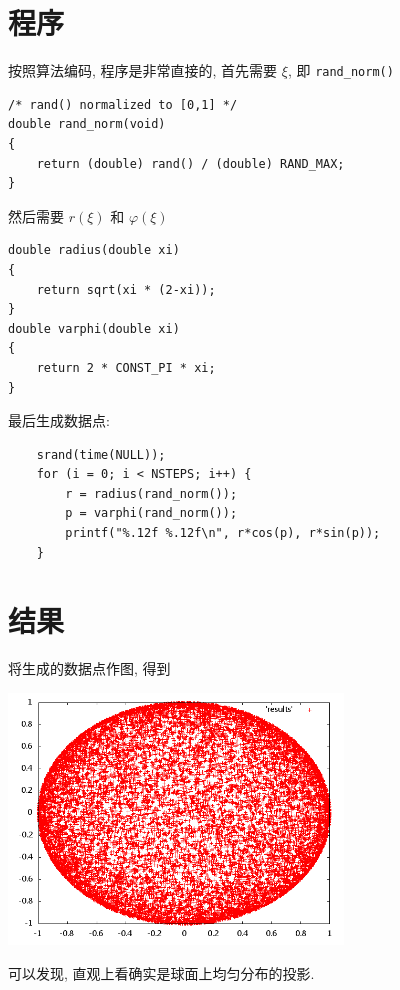 \documentclass{ctexart}
\begin{document}
\section{程序}
按照算法编码, 程序是非常直接的, 首先需要 $\xi$, 即 \verb|rand_norm()|
\begin{verbatim}
/* rand() normalized to [0,1] */
double rand_norm(void)
{
    return (double) rand() / (double) RAND_MAX;
}
\end{verbatim}
然后需要 $r(\xi)$ 和 $\varphi(\xi)$
\begin{verbatim}
double radius(double xi)
{
    return sqrt(xi * (2-xi));
}
double varphi(double xi)
{
    return 2 * CONST_PI * xi;
}
\end{verbatim}
最后生成数据点:
\begin{verbatim}
    srand(time(NULL));
    for (i = 0; i < NSTEPS; i++) {
        r = radius(rand_norm());
        p = varphi(rand_norm());
        printf("%.12f %.12f\n", r*cos(p), r*sin(p));
    }
\end{verbatim}

\section{结果}
将生成的数据点作图, 得到
\begin{center}
\includegraphics[width=3.5in]{sphere.png}
\end{center}
可以发现, 直观上看确实是球面上均匀分布的投影.
\end{document}
